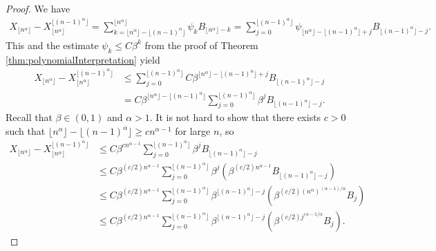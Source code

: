 \documentclass[bj]{imsart}
\numberwithin{equation}{section}
\newcommand{\1}{\mathbf{1}}
\theoremstyle{definition}
\begin{document}
\begin{proof}

We have
\begin{align*}
X_{\lfloor n^\alpha \rfloor}-X_{\lfloor n^\alpha \rfloor}^{\lfloor (n-1)^\alpha \rfloor}
= \sum_{k=\lfloor n^\alpha \rfloor-\lfloor (n-1)^\alpha \rfloor}^{\lfloor n^\alpha \rfloor} \psi_k B_{\lfloor n^\alpha \rfloor-k}
=\sum_{j=0}^{\lfloor (n-1)^\alpha \rfloor} \psi_{\lfloor n^\alpha \rfloor-\lfloor (n-1)^\alpha \rfloor+j} B_{\lfloor (n-1)^\alpha \rfloor-j} .
\end{align*}
This and the estimate $\psi_k\leq C\beta^k$ from the proof of Theorem \ref{thm:polynomialInterpretation} yield
\begin{align}
X_{\lfloor n^\alpha \rfloor}-X_{\lfloor n^\alpha \rfloor}^{\lfloor (n-1)^\alpha \rfloor}
&\leq \sum_{j=0}^{\lfloor (n-1)^\alpha \rfloor} C\beta^{\lfloor n^\alpha \rfloor-\lfloor (n-1)^\alpha \rfloor+j} B_{\lfloor (n-1)^\alpha \rfloor-j} \label{eq:inequalityDiffReducedSequence} \\ 
\nonumber&=C\beta^{\lfloor n^\alpha \rfloor-\lfloor (n-1)^\alpha \rfloor}\sum_{j=0}^{\lfloor (n-1)^\alpha \rfloor} \beta^{j} B_{\lfloor (n-1)^\alpha \rfloor-j}.
\end{align}
Recall that $\beta\in(0,1)$ and $\alpha>1$.
It is not hard to show that there exists $c>0$ such that $\lfloor n^\alpha \rfloor-\lfloor (n-1)^\alpha \rfloor\geq cn^{\alpha-1}$ for large  $n$, so
\begin{align}
X_{\lfloor n^\alpha \rfloor}-X_{\lfloor n^\alpha \rfloor}^{\lfloor (n-1)^\alpha \rfloor}
\nonumber&\leq C\beta^{cn^{\alpha-1}}\sum_{j=0}^{\lfloor (n-1)^\alpha \rfloor} \beta^{j} B_{\lfloor (n-1)^\alpha \rfloor-j}\\ 
\nonumber&\leq  C\beta^{(c/2)n^{\alpha-1}}\sum_{j=0}^{\lfloor (n-1)^\alpha \rfloor} \beta^{j} \left(\beta^{(c/2)n^{\alpha-1}} B_{\lfloor (n-1)^\alpha \rfloor-j}\right)\\
\nonumber&\leq  C\beta^{(c/2)n^{\alpha-1}}\sum_{j=0}^{\lfloor (n-1)^\alpha \rfloor} \beta^{\lfloor (n-1)^\alpha \rfloor-j} \left(\beta^{(c/2)(n^{\alpha})^{(\alpha-1)/\alpha}} B_{j}\right)\\
&\leq  C\beta^{(c/2)n^{\alpha-1}}\sum_{j=0}^{\lfloor (n-1)^\alpha \rfloor} \beta^{\lfloor (n-1)^\alpha \rfloor-j} \left(\beta^{(c/2)j^{(\alpha-1/\alpha}} B_{j}\right).\label{n24.1}
\end{align}


\end{proof}
\end{document}
